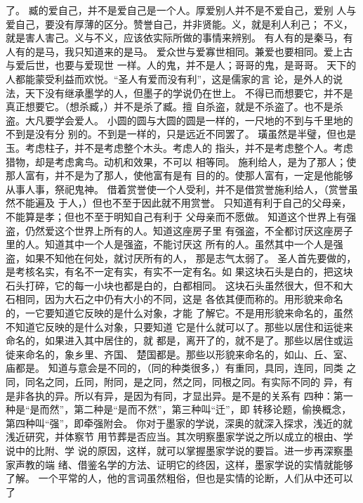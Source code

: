 \documentclass[12pt,UTF8]{ctexbook}
\begin{document}
了。 
臧的爱自己，并不是爱自己是一个人。厚爱别人并不是不爱自己，爱别 
人与爱自己，要没有厚薄的区分。赞誉自己，并非贤能。义，就是利人利己； 
不义，就是害人害己。义与不义，应该依实际所做的事情来辨别。 
有人有的是秦马，有人有的是马，我只知道来的是马。 
爱众世与爱寡世相同。兼爱也要相同。爱上古与爱后世，也要与爱现世 
一样。人的鬼，并不是人；哥哥的鬼，是哥哥。 
天下的人都能蒙受利益而欢悦。“圣人有爱而没有利”，这是儒家的言 
论，是外人的说法，天下没有继承墨学的人，但墨子的学说仍在世上。 
不得已而想要它，并不是真正想要它。（想杀臧，）并不是杀了臧。擅 
自杀盗，就是不杀盗了。也不是杀盗。大凡要学会爱人。 
小圆的圆与大圆的圆是一样的，一尺地的不到与千里地的不到是没有分 
别的。不到是一样的，只是远近不同罢了。 
璜虽然是半璧，但也是玉。考虑柱子，并不是考虑整个木头。考虑人的 
指头，并不是考虑整个人。考虑猎物，却是考虑禽鸟。动机和效果，不可以 
相等同。 
施利给人，是为了那人；使那人富有，并不是为了那人，使他富有是有 
目的的。使那人富有，一定是他能够从事人事，祭祀鬼神。 
借着赏誉使一个人受利，并不是借赏誉施利给人，（赏誉虽然不能遍及 
于人，）但也不至于因此就不用赏誉。 
只知道有利于自己的父母亲，不能算是孝；但也不至于明知自己有利于 
父母亲而不愿做。 
知道这个世界上有强盗，仍然爱这个世界上所有的人。知道这座房子里 
有强盗，不全都讨厌这座房子里的人。知道其中一个人是强盗，不能讨厌这 
所有的人。虽然其中一个人是强盗，如果不知他在何处，就讨厌所有的人， 
那是志气太弱了。 
圣人首先要做的，是考核名实，有名不一定有实，有实不一定有名。如 
果这块石头是白的，把这块石头打碎，它的每一小块也都是白的，白都相同。 
这块石头虽然很大，但不和大石相同，因为大石之中仍有大小的不同，这是 
各依其便而称的。用形貌来命名的，一它要知道它反映的是什么对象，才能 
了解它。不是用形貌来命名的，虽然不知道它反映的是什么对象，只要知道 
它是什么就可以了。那些以居住和运徙来命名的，如果进入其中居住的，就 
都是，离开了的，就不是了。那些以居住或运徙来命名的，象乡里、齐国、 
楚国都是。那些以形貌来命名的，如山、丘、室、庙都是。 
知道与意会是不同的，（同的种类很多，）有重同，具同，连同，同类 
之同，同名之同，丘同，附同，是之同，然之同，同根之同。有实际不同的 
异，有是非各执的异。所以有异，是因为有同，才显出异。是不是的关系有 
四种：第一种是“是而然”，第二种是“是而不然”，第三种叫“迁”，即 
转移论题，偷换概念，第四种叫“强”，即牵强附会。 
你对于墨家的学说，深奥的就深入探求，浅近的就浅近研究，并体察节 
用节葬是否应当。其次明察墨家学说之所以成立的根由、学说中的比附、学 
说的原因，这样，就可以掌握墨家学说的要旨。进一步再深察墨家声教的端 
绪、借鉴名学的方法、证明它的终因，这样，墨家学说的实情就能够了解。 
一个平常的人，他的言词虽然粗俗，但也是实情的论断，人们从中还可以了 
\end{document}
